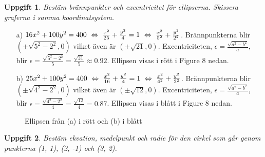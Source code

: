 \documentclass{article}
\newtheorem{thr}{Uppgift}
\begin{document}

\newpage

\begin{thr}
Bestäm brännpunkter och excentricitet för ellipserna. Skissera graferna i samma koordinatsystem.
\end{thr}

\begin{enumerate}
\item[a)] $16x^2+100y^2=400 \ \Leftrightarrow \  \frac{x^2}{25}+\frac{y^2}{4}=1 \ \Leftrightarrow \  \frac{x^2}{5^2}+\frac{y^2}{2^2}$. Brännpunkterna blir $(\pm \sqrt{5^2-2^2}, 0)$ vilket även är $(\pm \sqrt{21}, 0)$. Excentriciteten, $\epsilon=\frac{\sqrt{a^2-b^2}}{a}$, blir $\epsilon=\frac{\sqrt{5^2-2^2}}{5}=\frac{\sqrt{21}}{5} \approx 0.92$. Ellipsen visas i rött i Figure 8 nedan.
\item[b)] $25x^2+100y^2=400 \ \Leftrightarrow \  \frac{x^2}{16}+\frac{y^2}{4}=1 \ \Leftrightarrow \  \frac{x^2}{4^2}+\frac{y^2}{2^2}$. Brännpunkterna blir $(\pm \sqrt{4^2-2^2}, 0)$ vilket även är $(\pm \sqrt{12}, 0)$. Excentriciteten, $\epsilon=\frac{\sqrt{a^2-b^2}}{a}$, blir $\epsilon=\frac{\sqrt{4^2-2^2}}{4}=\frac{\sqrt{12}}{4}=0.87$. Ellipsen visas i blått i Figure 8 nedan.
\end{enumerate}

\vskip 1cm

\begin{figure}[h]
    \center
    \caption{\footnotesize Ellipsen från (a) i rött och (b) i blått}
\end{figure}


\newpage

\begin{thr}
Bestäm ekvation, medelpunkt och radie för den cirkel som går genom punkterna (1, 1), (2, -1) och (3, 2).
\end{thr}
\end{document}
